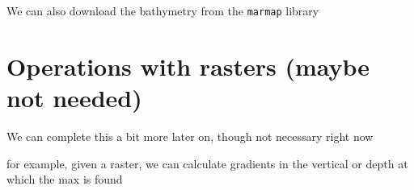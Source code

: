 \documentclass[
]{book}
\newenvironment{Shaded}{\begin{snugshade}}{\end{snugshade}}
\newcommand{\AttributeTok}[1]{\textcolor[rgb]{0.77,0.63,0.00}{#1}}
\newcommand{\CommentTok}[1]{\textcolor[rgb]{0.56,0.35,0.01}{\textit{#1}}}
\newcommand{\ConstantTok}[1]{\textcolor[rgb]{0.00,0.00,0.00}{#1}}
\newcommand{\DecValTok}[1]{\textcolor[rgb]{0.00,0.00,0.81}{#1}}
\newcommand{\FunctionTok}[1]{\textcolor[rgb]{0.00,0.00,0.00}{#1}}
\newcommand{\NormalTok}[1]{#1}
\newcommand{\OtherTok}[1]{\textcolor[rgb]{0.56,0.35,0.01}{#1}}
\newcommand{\SpecialCharTok}[1]{\textcolor[rgb]{0.00,0.00,0.00}{#1}}
\newcommand{\StringTok}[1]{\textcolor[rgb]{0.31,0.60,0.02}{#1}}
\begin{document}
We can also download the bathymetry from the \texttt{marmap} library

\begin{Shaded}
\end{Shaded}

\hypertarget{operations-with-rasters-maybe-not-needed}{%
\section{Operations with rasters (maybe not needed)}\label{operations-with-rasters-maybe-not-needed}}

We can complete this a bit more later on, though not necessary right now

for example, given a raster, we can calculate gradients in the vertical or depth at which the max is found
\end{document}

